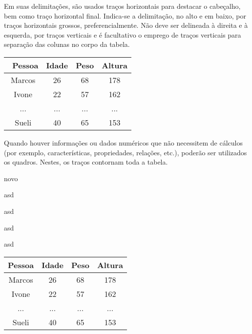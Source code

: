\documentclass[12pt,oneside,a4paper,chapter=TITLE,section=TITLE,sumario=tradicional]{abntex2}
\begin{document}
Em suas delimitações, são usados traços horizontais para destacar o cabeçalho, 
bem como traço horizontal final. Indica-se a delimitação, no alto e em baixo, 
por traços horizontais grossos, preferencialmente. Não deve ser delineada à 
direita e à esquerda, por traços verticais e é facultativo o emprego de traços 
verticais para separação das colunas no corpo da tabela.

\begin{table}[htb]
    \begin{tabular}{c|ccc}
        \hline\
        \textbf{Pessoa} & \textbf{Idade} & \textbf{Peso} & \textbf{Altura} \\ 
        \hline\hline
        Marcos & 26    & 68   & 178    \\ 
        Ivone  & 22    & 57   & 162    \\ 
        ...    & ...   & ...  & ...    \\ 
        Sueli  & 40    & 65   & 153    \\ \hline
    \end{tabular}
    
    \fonteautor
\end{table}
 
Quando houver informações ou dados numéricos que não necessitem de cálculos 
(por exemplo, características, propriedades, relações, etc.), poderão ser 
utilizados os quadros. Nestes, os traços contornam toda a tabela.

\begin{lista}
	\item novo
	\item asd
	\item asd
	\item asd
	\item asd
\end{lista}

\begin{quadro}[htb]
    \begin{tabular}{|c||c|c|c|}
        \hline
        \textbf{Pessoa} & \textbf{Idade} & \textbf{Peso} & \textbf{Altura} \\ 
        \hline\hline
        Marcos & 26    & 68   & 178    \\ \hline
        Ivone  & 22    & 57   & 162    \\ \hline
        ...    & ...   & ...  & ...    \\ \hline
        Sueli  & 40    & 65   & 153    \\ \hline
    \end{tabular}
    
\end{quadro}
\end{document}
